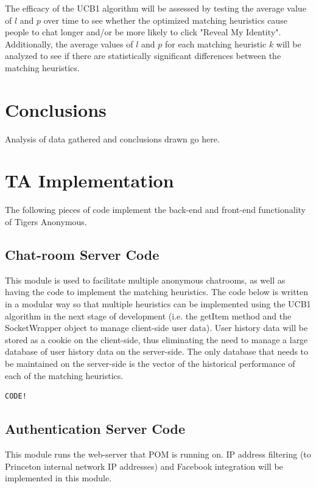 \documentclass{report}
\begin{document}
The efficacy of the UCB1 algorithm will be assessed by testing the average value of $l$ and $p$ over time to see whether the optimized matching heuristics cause people to chat longer and/or be more likely to click "Reveal My Identity". Additionally, the average values of $l$ and $p$ for each matching heuristic $k$ will be analyzed to see if there are statistically significant differences between the matching heuristics.

\chapter{Conclusions}

Analysis of data gathered and conclusions drawn go here.

\appendix
\chapter{TA Implementation}
\label{Appendix_TA_Implementation}

The following pieces of code implement the back-end and front-end functionality of Tigers Anonymous. 

\section{Chat-room Server Code} 

This module is used to facilitate multiple anonymous chatrooms, as well as having the code to implement the matching heuristics. The code below is written in a modular way so that multiple heuristics can be implemented using the UCB1 algorithm in the next stage of development (i.e. the getItem method and the SocketWrapper object to manage client-side user data). User history data will be stored as a cookie on the client-side, thus eliminating the need to manage a large database of user history data on the server-side. The only database that needs to be maintained on the server-side is the vector of the historical performance of each of the matching heuristics.

\begin{lstlisting}
CODE!
\end{lstlisting}

\section{Authentication Server Code}

This module runs the web-server that POM is running on. IP address filtering (to Princeton internal network IP addresses) and Facebook integration will be implemented in this module.
\end{document}
